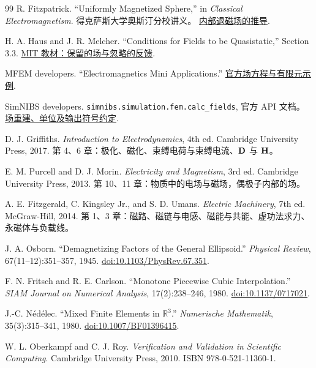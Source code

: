 \begin{thebibliography}{99}
 R. Fitzpatrick. ``Uniformly Magnetized Sphere,'' in \emph{Classical Electromagnetism}. 得克萨斯大学奥斯汀分校讲义。 \href{https://farside.ph.utexas.edu/teaching/jk1/Electromagnetism/node61.html}{内部退磁场的推导}.

 H. A. Haus and J. R. Melcher. ``Conditions for Fields to be Quasistatic,'' Section 3.3. \href{https://web.mit.edu/6.013_book/www/chapter3/3.3.html}{MIT 教材：保留的场与忽略的反馈}.

 MFEM developers. ``Electromagnetics Mini Applications.'' \href{https://mfem.org/electromagnetics/}{官方场方程与有限元示例}.

 SimNIBS developers. \texttt{simnibs.simulation.fem.calc\_fields}, 官方 API 文档。 \href{https://simnibs.github.io/simnibs/build/html/documentation/python_lib/auto/simnibs.simulation.fem.calc_fields.html}{场重建、单位及输出符号约定}.


 D. J. Griffiths. \emph{Introduction to Electrodynamics}, 4th ed. Cambridge University Press, 2017. 第 4、6 章：极化、磁化、束缚电荷与束缚电流、$\mathbf{D}$ 与 $\mathbf{H}$。

 E. M. Purcell and D. J. Morin. \emph{Electricity and Magnetism}, 3rd ed. Cambridge University Press, 2013. 第 10、11 章：物质中的电场与磁场，偶极子内部的场。


 A. E. Fitzgerald, C. Kingsley Jr., and S. D. Umans. \emph{Electric Machinery}, 7th ed. McGraw-Hill, 2014. 第 1、3 章：磁路、磁链与电感、磁能与共能、虚功法求力、永磁体与负载线。

 J. A. Osborn. ``Demagnetizing Factors of the General Ellipsoid.'' \emph{Physical Review}, 67(11--12):351--357, 1945. \href{https://doi.org/10.1103/PhysRev.67.351}{doi:10.1103/PhysRev.67.351}.

 F. N. Fritsch and R. E. Carlson. ``Monotone Piecewise Cubic Interpolation.'' \emph{SIAM Journal on Numerical Analysis}, 17(2):238--246, 1980. \href{https://doi.org/10.1137/0717021}{doi:10.1137/0717021}.

 J.-C. Nédélec. ``Mixed Finite Elements in $\mathbb{R}^3$.'' \emph{Numerische Mathematik}, 35(3):315--341, 1980. \href{https://doi.org/10.1007/BF01396415}{doi:10.1007/BF01396415}.

 W. L. Oberkampf and C. J. Roy. \emph{Verification and Validation in Scientific Computing}. Cambridge University Press, 2010. ISBN 978-0-521-11360-1.

\end{thebibliography}
